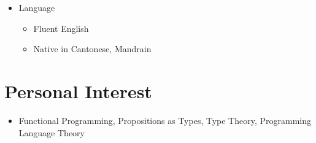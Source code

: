 \documentclass[a4paper,12pt]{article}
\begin{document}
\begin{itemize}
  
    \item Language
    \begin{itemize}
      \item Fluent English
      \item Native in Cantonese, Mandrain
    \end{itemize}
  \end{itemize}

  \section*{Personal Interest}
  \begin{itemize}
    \item Functional Programming, Propositions as Types, Type Theory, Programming Language Theory
  \end{itemize}

\end{document}

